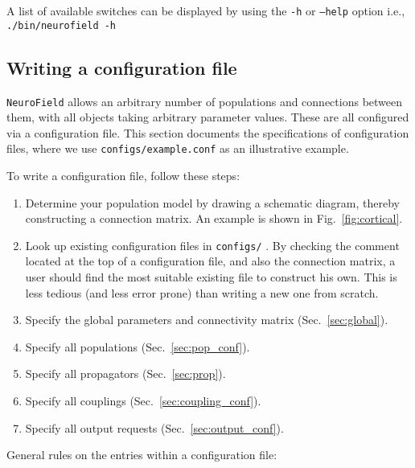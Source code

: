 \documentclass[12pt,a4paper]{article}
\newcommand{\type}[1]{{\small\small\tt #1} }
\newcommand{\NF}[0]{\type{NeuroField}}
\begin{document}
A list of available switches can be displayed by using the \type{-h} or \type{--help} option i.e., \type{./bin/neurofield -h}

\subsection{Writing a configuration file}
\label{sec:config}

\NF allows an arbitrary number of populations and connections between them, with all objects taking arbitrary parameter values. These are all configured via a configuration file. This section documents the specifications of configuration files, where we use \type{configs/example.conf} as an illustrative example.

To write a configuration file, follow these steps:
\begin{enumerate}
\item Determine your population model by drawing a schematic diagram, thereby constructing a connection matrix. An example is shown in Fig.~\ref{fig:cortical}.
\item Look up existing configuration files in \type{configs/}. By checking the comment located at the top of a configuration file, and also the connection matrix, a user should find the most suitable existing file to construct his own. This is less tedious (and less error prone) than writing a new one from scratch.
\item Specify the global parameters and connectivity matrix (Sec.~\ref{sec:global}).
\item Specify all populations (Sec.~\ref{sec:pop_conf}).
\item Specify all propagators (Sec.~\ref{sec:prop}).
\item Specify all couplings (Sec.~\ref{sec:coupling_conf}).
\item Specify all output requests (Sec.~\ref{sec:output_conf}).
\end{enumerate}

General rules on the entries within a configuration file:
\end{document}
